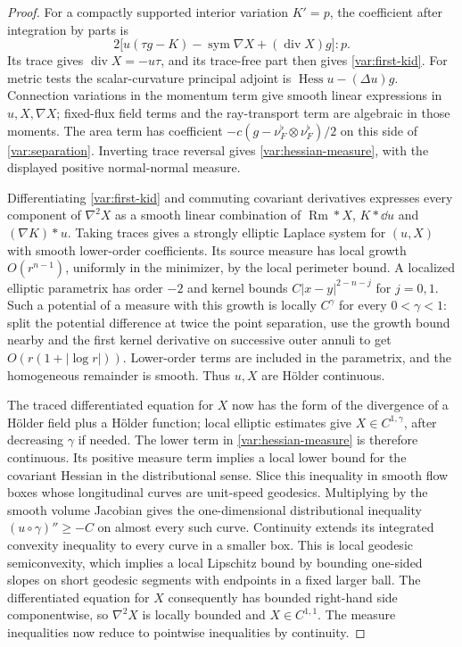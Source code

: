 \begin{proof}
For a compactly supported interior variation $K'=p$, the
coefficient after integration by parts is
\begin{equation}
 2\bigl[u(\tau g-K)-\operatorname{sym}\nabla X
                                  +(\operatorname{div}X)g\bigr]:p.
 \label{var:second-tensor-adjoint}
\end{equation}
Its trace gives $\operatorname{div}X=-u\tau$, and its
trace-free part then gives \eqref{var:first-kid}.
For metric tests the scalar-curvature principal adjoint is
$\operatorname{Hess}u-(\Delta u)g$.
Connection variations in the momentum term give smooth
linear expressions in $u,X,\nabla X$; fixed-flux field terms
and the ray-transport term are algebraic in those moments.
The area term has coefficient
$-c(g-\nu_F^\flat\otimes\nu_F^\flat)/2$ on this side of
\eqref{var:separation}.  Inverting trace reversal gives
\eqref{var:hessian-measure}, with the displayed positive
normal-normal measure.

Differentiating \eqref{var:first-kid} and commuting
covariant derivatives expresses every component of
$\nabla^2X$ as a smooth linear combination of
$\operatorname{Rm}*X$, $K*\dd u$ and $(\nabla K)*u$.
Taking traces gives a strongly elliptic Laplace system for
$(u,X)$ with smooth lower-order coefficients.  Its source
measure has local growth $O(r^{n-1})$, uniformly in the
minimizer, by the local perimeter bound.  A localized
elliptic parametrix has order $-2$ and kernel bounds
$C|x-y|^{2-n-j}$ for $j=0,1$.  Such a potential of a measure
with this growth is locally $C^\gamma$ for every
$0<\gamma<1$: split the potential difference at twice the
point separation, use the growth bound nearby and the
first kernel derivative on successive outer annuli to get
$O(r(1+|\log r|))$.  Lower-order terms are included in the
parametrix, and the homogeneous remainder is smooth.
Thus $u,X$ are H\"older continuous.

The traced differentiated equation for $X$ now has the
form of the divergence of a H\"older field plus a
H\"older function; local elliptic estimates give
$X\in C^{1,\gamma}$, after decreasing $\gamma$ if needed.
The lower term in \eqref{var:hessian-measure} is therefore
continuous.  Its positive measure term implies a local
lower bound for the covariant Hessian in the distributional
sense.  Slice this inequality in smooth flow boxes whose
longitudinal curves are unit-speed geodesics.  Multiplying
by the smooth volume Jacobian gives the one-dimensional
distributional inequality $(u\circ\gamma)''\ge-C$ on
almost every such curve.  Continuity extends its integrated
convexity inequality to every curve in a smaller box.
This is local geodesic semiconvexity, which implies a local
Lipschitz bound by bounding one-sided slopes on short
geodesic segments with endpoints in a fixed larger ball.
The differentiated
equation for $X$ consequently has bounded right-hand
side componentwise, so $\nabla^2X$ is locally bounded and
$X\in C^{1,1}$.  The measure inequalities now reduce to
pointwise inequalities by continuity.
\end{proof}


